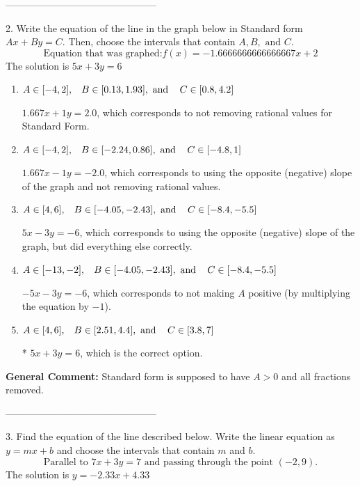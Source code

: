 \documentclass{extbook}[14pt]
\begin{document}
-----------------------------------------------

2. Write the equation of the line in the graph below in Standard form $Ax+By=C$. Then, choose the intervals that contain $A, B, \text{ and } C$.
\[ \text{Equation that was graphed:} f(x)= -1.6666666666666667x + 2 \] 
The solution is $ 5x + 3y = 6 $ 

\begin{enumerate}[label=\Alph*.] 
\item $ A \in [-4, 2], \hspace{3mm} B \in [0.13, 1.93], \text{ and } \hspace{3mm} C \in [0.8, 4.2] $ 

  $1.667x + 1y = 2.0$, which corresponds to not removing rational values for Standard Form. 
\item $ A \in [-4, 2], \hspace{3mm} B \in [-2.24, 0.86], \text{ and } \hspace{3mm} C \in [-4.8, 1] $ 

  $1.667x - 1y = -2.0$, which corresponds to using the opposite (negative) slope of the graph and not removing rational values. 
\item $ A \in [4, 6], \hspace{3mm} B \in [-4.05, -2.43], \text{ and } \hspace{3mm} C \in [-8.4, -5.5] $ 

  $5x - 3y = -6$, which corresponds to using the opposite (negative) slope of the graph, but did everything else correctly. 
\item $ A \in [-13, -2], \hspace{3mm} B \in [-4.05, -2.43], \text{ and } \hspace{3mm} C \in [-8.4, -5.5] $ 

  $-5x - 3y = -6$, which corresponds to not making $A$ positive (by multiplying the equation by $-1$). 
\item $ A \in [4, 6], \hspace{3mm} B \in [2.51, 4.4], \text{ and } \hspace{3mm} C \in [3.8, 7] $ 

 * $5x + 3y = 6$, which is the correct option. 
\end{enumerate} 
 
\textbf{General Comment:} Standard form is supposed to have $A > 0$ and all fractions removed. 

-----------------------------------------------

3. Find the equation of the line described below. Write the linear equation as $ y=mx+b $ and choose the intervals that contain $m$ and $b$.
\[ \text{Parallel to } 7 x + 3 y = 7 \text{ and passing through the point } (-2, 9). \] 
The solution is $ y = -2.33x + 4.33 $ 
\end{document}

